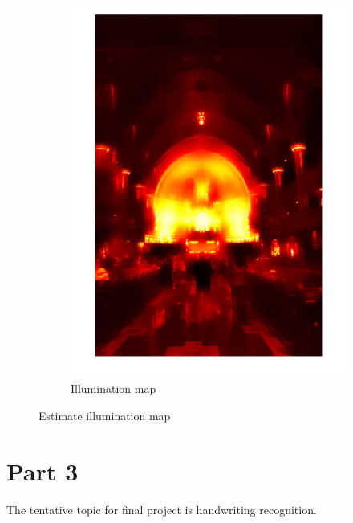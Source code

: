 \documentclass[conference]{IEEEtran}
\begin{document}
\begin{figure}[h!]
\begin{subfigure}[b]{0.4\linewidth}
\includegraphics[width=\linewidth]{images/img30.jpg}
\caption{Illumination map}
\end{subfigure}
\caption{Estimate illumination map}
\label{fig:illumination map}
\end{figure}



\section{Part 3}

The tentative topic for final project is handwriting recognition. 
\end{document}
